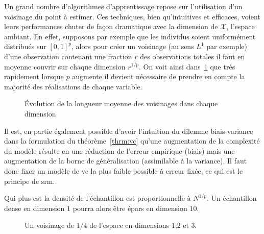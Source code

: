 Un grand nombre d'algorithmes d'apprentissage repose sur l'utilisation d'un voisinage du point à estimer. Ces techniques, bien qu'intuitives et efficaces, voient leurs performances chuter de façon dramatique avec la dimension de $\mathcal{X}$, l'espace ambiant. En effet, supposons par exemple que les individus soient uniformément distribués sur $[0,1]^p$, alors pour créer un voisinage (au sens $L^1$ par exemple) d'une observation contenant une fraction $r$ des observations totales il faut en moyenne couvrir sur chaque dimension $r^{1/p}$. On voit ainsi dans~\ref{fig:distance.haute.dim} que très rapidement lorsque $p$ augmente il devient nécessaire de prendre en compte la majorité des réalisations de chaque variable.

\begin{figure}[htbp]
    \centering
    \caption{Évolution de la longueur moyenne des voisinages dans chaque dimension}\label{fig:distance.haute.dim}
\end{figure}


Il est, en partie également possible d'avoir l'intuition du dilemme biais-variance dans la formulation du théorème~\ref{thrm:vc} qu'une augmentation de la complexité du modèle résulte en une réduction de l'erreur empirique (biais) mais une augmentation de la borne de généralisation (assimilable à la variance). Il faut donc fixer un modèle de \ac{vc} la plus faible possible à erreur fixée, ce qui est le principe de \ac{srm}.

Qui plus est la densité de l'échantillon est proportionnelle à $N^{1/p}$. Un échantillon dense en dimension $1$ pourra alors être épars en dimension $10$.

\begin{figure}[htbp]
    \centering
    \caption{Un voisinage de $1/4$ de l'espace en dimensions $1$,$2$ et $3$.}
\end{figure}


